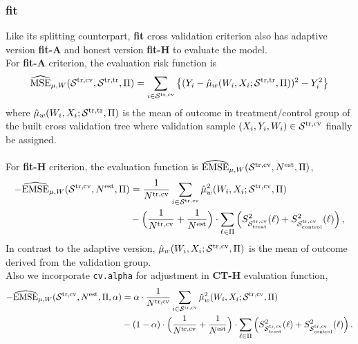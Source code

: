 \documentclass[11pt]{article}
\newcommand{\emse}{{\rm EMSE}}
\newcommand{\est}{{\rm est}}
\newcommand{\calp}{{\Pi}}
\newcommand{\cals}{{\cal S}}
\newcommand{\mse}{{\rm MSE}}
\newcommand{\control}{{\rm control}}
\newcommand{\treat}{{\rm treat}}
\newcommand{\train}{{\rm tr}}
\newcommand{\tcv}{{\rm cv}}
\begin{document}
\subsubsection{fit}
Like its splitting counterpart, \textbf{fit} cross validation criterion also has adaptive version \textbf{fit-A} and honest version \textbf{fit-H} to evaluate the model.\\
For \textbf{fit-A} criterion, the evaluation risk function is
\[\widehat{\mse}_{\mu, W}(\cals^{\train, \tcv},\cals^{\train, \train},\calp) =  \sum_{i\in\cals^{\train, \tcv}} \left\{(Y_i-\hat\mu_w(W_i,X_i;\cals^{\train, \train},\calp))^2-Y^2_i\right\}\]
where $\hat\mu_w(W_i,X_i;\cals^{\train, \train},\calp)$ is the mean of outcome in treatment/control group of the built cross validation tree where validation sample $(X_i, Y_i, W_i) \in \cals^{\train, \tcv}$ finally be assigned.\\
\\
For \textbf{fit-H} criterion, the evaluation function is $\widehat{\emse}_{\mu, W}(\cals^{\train, \tcv}, N^\est, \calp)$,
\begin{align*}
-\widehat{\emse}_{\mu, W}(\cals^{\train, \tcv}, N^\est, \calp) & =
\frac{1}{N^{\train, \tcv}}\sum_{i\in\cals^{\train, \tcv}} \hat\mu_w^2(W_i,X_i;\cals^{\train, \tcv},\calp) \\
& -
\Bigl(\frac{1}{N^{\train, \tcv}} + \frac{1}{N^\est}\Bigr)\cdot \sum_{\ell\in\calp}
\left( S^2_{\cals^{\train, \tcv}_\treat}(\ell)+ S^2_{\cals^{\train, \tcv}_\control}(\ell)\right),
\end{align*}
In contrast to the adaptive version, $\hat\mu_w(W_i,X_i;\cals^{\train, \tcv},\calp)$ is the mean of outcome derived from the validation group.\\
Also we incorporate \texttt{cv.alpha} for adjustment in \textbf{CT-H} evaluation function,
\begin{align*}
-\widehat{\emse}_{\mu, W}(\cals^{\train, \tcv}, N^\est, \calp, \alpha) & =
\alpha \cdot \frac{1}{N^{\train, \tcv}}\sum_{i\in\cals^{\train, \tcv}} \hat\mu_w^2(W_i,X_i;\cals^{\train, \tcv},\calp) \\
& - (1 - \alpha) \cdot
\Bigl(\frac{1}{N^{\train, \tcv}} + \frac{1}{N^\est}\Bigr)\cdot \sum_{\ell\in\calp}
\left( S^2_{\cals^{\train, \tcv}_\treat}(\ell)+ S^2_{\cals^{\train, \tcv}_\control}(\ell)\right).
\end{align*}
\end{document}
